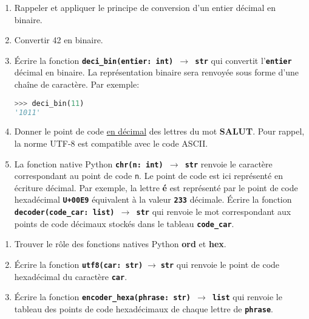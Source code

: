 \documentclass[a4paper,11pt]{article}
\begin{document}
\begin{exo}
\begin{enumerate}
    \item Rappeler et appliquer le principe de conversion d'un entier décimal en binaire.
    \item Convertir 42 en binaire.
    \item Écrire la fonction \textbf{\texttt{deci\_bin(entier: int) $\rightarrow$ str}} qui convertit l'\textbf{\texttt{entier}} décimal en binaire. La représentation binaire sera renvoyée sous forme d'une chaîne de caractère. Par exemple:
    \begin{lstlisting}[language=Python  , xleftmargin=2em, xrightmargin=2em]
>>> deci_bin(11)
'1011'
\end{lstlisting}
    \item Donner le point de code \underline{en décimal} des lettres du mot \textbf{SALUT}. Pour rappel, la norme UTF-8 est compatible avec le code ASCII.
    \item La fonction native Python \textbf{\texttt{chr(n: int) $\rightarrow$ str}} renvoie le caractère correspondant au point de code \textnormal{\texttt{n}}. Le point de code est ici représenté en écriture décimal. Par exemple, la lettre \textbf{é} est représenté par le point de code hexadécimal \textbf{\texttt{U+00E9}} équivalent à la valeur \textbf{\texttt{233}} décimale. Écrire la fonction \textbf{\texttt{decoder(code\_car: list) $\rightarrow$ str}} qui renvoie le mot correspondant aux points de code décimaux stockés dans le tableau \textbf{\texttt{code\_car}}.
\end{enumerate}
\end{exo}
\begin{exo}
    \begin{enumerate}
        \item Trouver le rôle des fonctions natives Python \textbf{ord} et \textbf{hex}.
        \item Écrire la fonction \texttt{\textbf{utf8(car: str)$\;\rightarrow\;$str}} qui renvoie le point de code hexadécimal du caractère \textbf{\texttt{car}}.
        \item Écrire la fonction \textbf{\texttt{encoder\_hexa(phrase: str) $\rightarrow$ list}} qui renvoie le tableau des points de code hexadécimaux de chaque lettre de \textbf{\texttt{phrase}}.
    \end{enumerate}
\end{exo}
\end{document}
